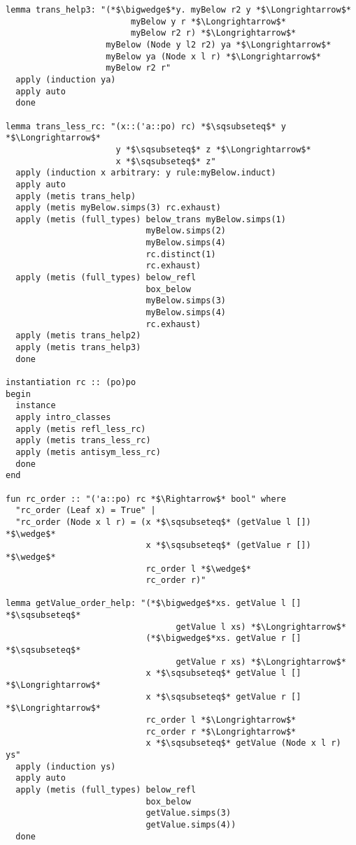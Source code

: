 \begin{lstlisting}[language=Isabelle]
lemma trans_help3: "(*$\bigwedge$*y. myBelow r2 y *$\Longrightarrow$* 
                         myBelow y r *$\Longrightarrow$* 
                         myBelow r2 r) *$\Longrightarrow$*
                    myBelow (Node y l2 r2) ya *$\Longrightarrow$* 
                    myBelow ya (Node x l r) *$\Longrightarrow$* 
                    myBelow r2 r"
  apply (induction ya)
  apply auto
  done

lemma trans_less_rc: "(x::('a::po) rc) *$\sqsubseteq$* y *$\Longrightarrow$* 
                      y *$\sqsubseteq$* z *$\Longrightarrow$* 
                      x *$\sqsubseteq$* z"
  apply (induction x arbitrary: y rule:myBelow.induct)
  apply auto
  apply (metis trans_help)
  apply (metis myBelow.simps(3) rc.exhaust)
  apply (metis (full_types) below_trans myBelow.simps(1) 
                            myBelow.simps(2) 
                            myBelow.simps(4) 
                            rc.distinct(1) 
                            rc.exhaust)
  apply (metis (full_types) below_refl 
                            box_below 
                            myBelow.simps(3) 
                            myBelow.simps(4) 
                            rc.exhaust)
  apply (metis trans_help2)
  apply (metis trans_help3)
  done

instantiation rc :: (po)po
begin
  instance
  apply intro_classes
  apply (metis refl_less_rc)
  apply (metis trans_less_rc)
  apply (metis antisym_less_rc)
  done
end

fun rc_order :: "('a::po) rc *$\Rightarrow$* bool" where
  "rc_order (Leaf x) = True" |
  "rc_order (Node x l r) = (x *$\sqsubseteq$* (getValue l []) *$\wedge$* 
                            x *$\sqsubseteq$* (getValue r []) *$\wedge$* 
                            rc_order l *$\wedge$* 
                            rc_order r)"

lemma getValue_order_help: "(*$\bigwedge$*xs. getValue l [] *$\sqsubseteq$* 
                                  getValue l xs) *$\Longrightarrow$*
                            (*$\bigwedge$*xs. getValue r [] *$\sqsubseteq$* 
                                  getValue r xs) *$\Longrightarrow$*
                            x *$\sqsubseteq$* getValue l [] *$\Longrightarrow$*
                            x *$\sqsubseteq$* getValue r [] *$\Longrightarrow$* 
                            rc_order l *$\Longrightarrow$* 
                            rc_order r *$\Longrightarrow$* 
                            x *$\sqsubseteq$* getValue (Node x l r) ys"
  apply (induction ys)
  apply auto
  apply (metis (full_types) below_refl 
                            box_below 
                            getValue.simps(3) 
                            getValue.simps(4))
  done


\end{lstlisting}
